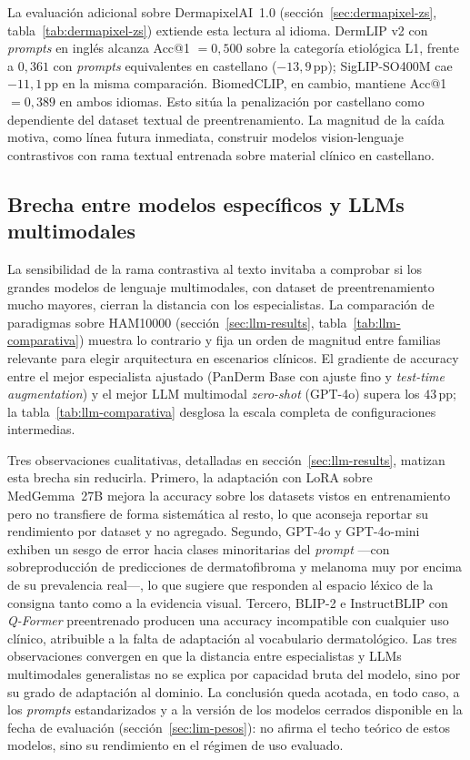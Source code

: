 La evaluación adicional sobre DermapixelAI~1.0
(sección~\ref{sec:dermapixel-zs}, tabla~\ref{tab:dermapixel-zs})
extiende esta lectura al idioma. DermLIP v2 con \emph{prompts} en
inglés alcanza Acc@1 $= 0{,}500$ sobre la categoría etiológica
L1, frente a $0{,}361$ con \emph{prompts} equivalentes en
castellano ($-13{,}9$\,pp); SigLIP-SO400M cae $-11{,}1$\,pp en
la misma comparación. BiomedCLIP, en cambio, mantiene Acc@1
$= 0{,}389$ en ambos idiomas. Esto sitúa la penalización por
castellano como dependiente del dataset textual de preentrenamiento.
La magnitud de la caída motiva, como línea futura inmediata,
construir modelos vision-lenguaje contrastivos con rama textual
entrenada sobre material clínico en castellano.

\subsection{Brecha entre modelos específicos y LLMs multimodales}
\label{sec:disc-llm}

La sensibilidad de la rama contrastiva al texto invitaba a
comprobar si los grandes modelos de lenguaje multimodales, con
dataset de preentrenamiento mucho mayores, cierran la distancia con
los especialistas. La comparación de paradigmas sobre HAM10000
(sección~\ref{sec:llm-results}, tabla~\ref{tab:llm-comparativa})
muestra lo contrario y fija un orden de magnitud entre familias
relevante para elegir arquitectura en escenarios clínicos. El
gradiente de accuracy entre el mejor especialista ajustado (PanDerm
Base con ajuste fino y \emph{test-time augmentation}) y el mejor LLM
multimodal \emph{zero-shot} (GPT-4o) supera los $43$\,pp; la
tabla~\ref{tab:llm-comparativa} desglosa la escala completa de
configuraciones intermedias.

Tres observaciones cualitativas, detalladas en
sección~\ref{sec:llm-results}, matizan esta brecha sin reducirla.
Primero, la adaptación con LoRA sobre MedGemma~27B mejora la accuracy
sobre los datasets vistos en entrenamiento pero no transfiere de forma
sistemática al resto, lo que aconseja reportar su rendimiento por dataset
y no agregado. Segundo, GPT-4o y GPT-4o-mini exhiben un sesgo de error
hacia clases minoritarias del \emph{prompt} ---con sobreproducción de
predicciones de dermatofibroma y melanoma muy por encima de su prevalencia
real---, lo que sugiere que responden al espacio léxico de la consigna
tanto como a la evidencia visual. Tercero, BLIP-2 e InstructBLIP con
\emph{Q-Former} preentrenado producen una accuracy incompatible con
cualquier uso clínico, atribuible a la falta de adaptación al vocabulario
dermatológico. Las tres observaciones convergen en que la distancia entre
especialistas y LLMs multimodales generalistas no se explica por capacidad
bruta del modelo, sino por su grado de adaptación al dominio. La
conclusión queda acotada, en todo caso, a los \emph{prompts}
estandarizados y a la versión de los modelos cerrados disponible en la
fecha de evaluación (sección~\ref{sec:lim-pesos}): no afirma el techo
teórico de estos modelos, sino su rendimiento en el régimen de uso
evaluado.

